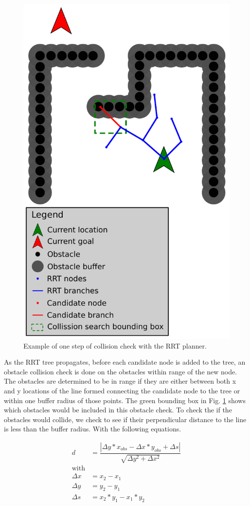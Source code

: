\documentclass[letterpaper, 10 pt, conference]{ieeeconf}  %
\begin{document}
\begin{figure}
\centering
\includegraphics[width=0.8\linewidth]{rrt_sample}
\caption{Example of one step of collision check with the RRT planner.}
\label{fig:rrt_sample}
\end{figure}

As the RRT tree propagates, before each candidate node is added to the tree, an obstacle collision check is done on the obstacles within range of the new node. The obstacles are determined to be in range if they are either between both x and y locations of the line formed connecting the candidate node to the tree or within one buffer radius of those points. The green bounding box in Fig. \ref{fig:rrt_sample} shows which obstacles would be included in this obstacle check. To check the if the obstacles would collide, we check to see if their perpendicular distance to the line is less than the buffer radius. With the following equations.

\begin{align}
  d &= \dfrac{|\Delta y*x_{\mathit{obs}} -
      \Delta x*y_{\mathit{obs}} + \Delta s|}
      {\sqrt{\Delta y^2 + \Delta x^2}}\\
  \nonumber \text{with}\\
  \Delta x &= x_2 - x_1\\
  \Delta y &= y_2 - y_1\\
  \Delta s &= x_2*y_1 -x_1*y_2
\end{align}
\end{document}
